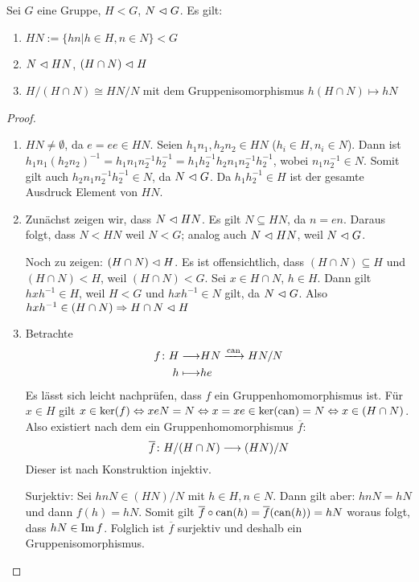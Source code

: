 \documentclass[12pt,a4paper]{scrartcl}
\begin{document}
\begin{satz}[1. Isomorphiesatz] \label{thm:iso1_g}
	Sei $G$ eine Gruppe, $H<G$, $N\vartriangleleft G$. Es gilt:
	\begin{enumerate}
		\item $HN:=\{hn|h\in H, n\in N\}<G$
		\item $N\vartriangleleft HN$, $(H\cap N)\vartriangleleft H$
		\item $H/(H\cap N) \cong HN/N$ mit dem Gruppenisomorphismus $h(H\cap N)\mapsto hN$
	\end{enumerate}
\end{satz}	
\begin{proof}
	\leavevmode
	\begin{enumerate}
		\item $HN\neq \emptyset$, da $e = ee\in HN$. Seien $h_1n_1,h_2n_2\in HN$ ($h_i\in H, n_i\in N$). Dann ist $h_1n_1(h_2n_2)^{-1} = h_1n_1n_2^{-1}h_2^{-1} = h_1h_2^{-1}h_2n_1n_2^{-1}h_2^{-1}$, wobei $n_1n_2^{-1}\in N$. Somit gilt auch $h_2n_1n_2^{-1}h_2^{-1}\in N$, da $N\vartriangleleft G$. Da $h_1h_2^{-1}\in H$ ist der gesamte Ausdruck Element von $HN$.
		\item Zunächst zeigen wir, dass $N\vartriangleleft HN$. Es gilt $N\subseteq HN$, da $n = en$. Daraus folgt, dass $N<HN$ weil $N<G$; analog auch $N\vartriangleleft HN$, weil $N\vartriangleleft G$.
		
		Noch zu zeigen: $(H\cap N)\vartriangleleft H$. Es ist offensichtlich, dass $(H\cap N)\subseteq H$ und $(H\cap N)<H$, weil $(H\cap N)<G$. Sei $x\in H\cap N$, $h\in H$. Dann gilt $hxh^{-1}\in H$, weil $H<G$ und $hxh^{-1} \in N$ gilt, da $N\vartriangleleft G$. Also $hxh^{-1}\in (H\cap N) \Rightarrow H\cap N\vartriangleleft H$
		\item Betrachte 
		\begin{align*}
			f\colon H \longrightarrow& HN \xrightarrow{\operatorname{can}} HN/N\\
			h \longmapsto &he
		\end{align*}
		Es lässt sich leicht nachprüfen, dass $f$ ein Gruppenhomomorphismus ist. Für $x\in H$ gilt $x\in \operatorname{ker}(f)\Leftrightarrow xeN = N\Leftrightarrow x = xe\in \operatorname{ker}(\operatorname{can}) = N\Leftrightarrow x\in (H\cap N)$. Also existiert nach dem  ein Gruppenhomomorphismus $\overline{f}$:
		\begin{equation*}
			\overline{f}\colon H/(H\cap N)\longrightarrow (HN)/N
		\end{equation*}
		Dieser ist nach Konstruktion injektiv.
		
		Surjektiv: Sei $hnN\in (HN)/N$ mit $h\in H, n\in N$. Dann gilt aber: $hnN = hN$ und dann $f(h)=hN$. Somit gilt $\overline{f}\circ\operatorname{can}(h) = \overline{f}(\operatorname{can}(h)) = hN$ woraus folgt, dass $hN\in \operatorname{Im} f$. Folglich ist $\overline{f}$ surjektiv und deshalb ein Gruppenisomorphismus.
  \qedhere
	\end{enumerate}
\end{proof}
\end{document}
